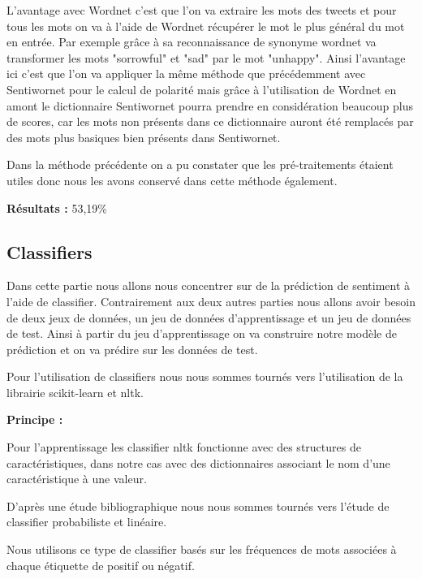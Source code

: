 \par L'avantage avec Wordnet c'est que l'on va extraire les mots des tweets et pour tous les mots on va à l'aide de Wordnet récupérer le mot le plus général du mot en entrée. Par exemple grâce à sa reconnaissance de synonyme wordnet va transformer les mots "sorrowful" et "sad" par le mot "unhappy". Ainsi l'avantage ici c'est que l'on va appliquer la même méthode que précédemment avec Sentiwornet pour le calcul de polarité mais grâce à l'utilisation de Wordnet en amont le dictionnaire Sentiwornet pourra prendre en considération beaucoup plus de scores, car les mots
non présents dans ce dictionnaire auront été remplacés par des mots plus basiques bien présents dans Sentiwornet. \\

\par Dans la méthode précédente on a pu constater que les pré-traitements étaient utiles donc nous les avons conservé dans cette méthode également. \\

\par\textbf{ Résultats : } 53,19\%

\subsection{Classifiers}

\par Dans cette partie nous allons nous concentrer sur de la prédiction de sentiment à l'aide de classifier. Contrairement aux deux autres parties nous allons avoir besoin de deux jeux de données, un jeu de données d'apprentissage et un jeu de données de test. Ainsi à partir du jeu d'apprentissage on va construire notre modèle de prédiction et on va prédire sur les données de test. \\

\par Pour l'utilisation de classifiers nous nous sommes tournés vers l'utilisation de la librairie scikit-learn et nltk. \\

\par \textbf{Principe : } \\
\par Pour l'apprentissage les classifier nltk fonctionne avec des structures de caractéristiques, dans notre cas avec des dictionnaires associant le nom d'une caractéristique à une valeur.
\par D'après une étude bibliographique nous nous sommes tournés vers l'étude de classifier probabiliste et linéaire.
\par Nous utilisons ce type de classifier basés sur les fréquences de mots associées à chaque étiquette de positif ou négatif. \\

